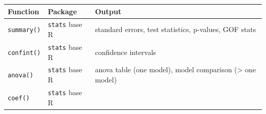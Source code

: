 \documentclass[
]{book}
\begin{document}
\begin{longtable}[]{@{}lll@{}}
\toprule
\begin{minipage}[b]{0.16\columnwidth}\raggedright
Function\strut
\end{minipage} & \begin{minipage}[b]{0.17\columnwidth}\raggedright
Package\strut
\end{minipage} & \begin{minipage}[b]{0.59\columnwidth}\raggedright
Output\strut
\end{minipage}\tabularnewline
\midrule
\endhead
\begin{minipage}[t]{0.16\columnwidth}\raggedright
\texttt{summary()}\strut
\end{minipage} & \begin{minipage}[t]{0.17\columnwidth}\raggedright
\texttt{stats} base R\strut
\end{minipage} & \begin{minipage}[t]{0.59\columnwidth}\raggedright
standard errors, test statistics, p-values, GOF stats\strut
\end{minipage}\tabularnewline
\begin{minipage}[t]{0.16\columnwidth}\raggedright
\texttt{confint()}\strut
\end{minipage} & \begin{minipage}[t]{0.17\columnwidth}\raggedright
\texttt{stats} base R\strut
\end{minipage} & \begin{minipage}[t]{0.59\columnwidth}\raggedright
confidence intervals\strut
\end{minipage}\tabularnewline
\begin{minipage}[t]{0.16\columnwidth}\raggedright
\texttt{anova()}\strut
\end{minipage} & \begin{minipage}[t]{0.17\columnwidth}\raggedright
\texttt{stats} base R\strut
\end{minipage} & \begin{minipage}[t]{0.59\columnwidth}\raggedright
anova table (one model), model comparison (\textgreater{} one model)\strut
\end{minipage}\tabularnewline
\begin{minipage}[t]{0.16\columnwidth}\raggedright
\texttt{coef()}\strut
\end{minipage} & \begin{minipage}[t]{0.17\columnwidth}\raggedright
\texttt{stats} base R\strut
\end{minipage} & \begin{minipage}[t]{0.59\columnwidth}\raggedright

\end{minipage}
\end{longtable}
\end{document}
